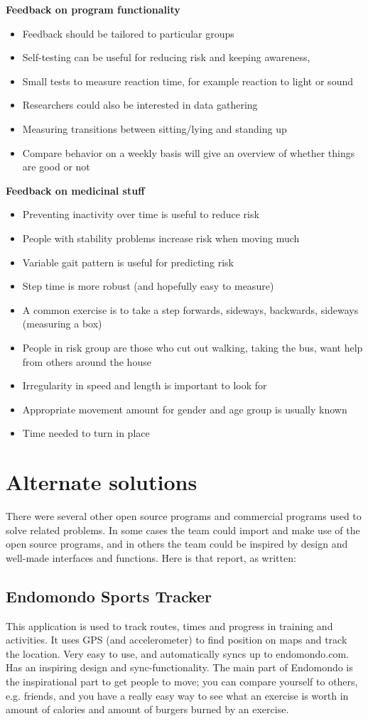 \textbf{Feedback on program functionality}
\begin{itemize}
\item Feedback should be tailored to particular groups
\item Self-testing can be useful for reducing risk and keeping awareness,
\item Small tests to measure reaction time, for example reaction to light or sound
\item Researchers could also be interested in data gathering
\item Measuring transitions between sitting/lying and standing up
\item Compare behavior on a weekly basis will give an overview of whether things are good or not
\end{itemize}

\textbf{Feedback on medicinal stuff}
\begin{itemize}
\item Preventing inactivity over time is useful to reduce risk
\item People with stability problems increase risk when moving much
\item Variable gait pattern is useful for predicting risk
\item Step time is more robust (and hopefully easy to measure)
\item A common exercise is to take a step forwards, sideways, backwards, sideways (measuring a box)
\item People in risk group are those who cut out walking, taking the bus, want help from others around the house
\item Irregularity in speed and length is important to look for
\item Appropriate movement amount for gender and age group is usually known
\item Time needed to turn in place
\end{itemize}


\section{Alternate solutions}
There were several other open source programs and commercial programs used to solve related problems. In some cases the team could import and make use of the open source programs, and in others the team could be inspired by design and well-made interfaces and functions. Here is that report, as written:

\subsection{Endomondo Sports Tracker}
This application is used to track routes, times and progress in training and activities. It uses GPS (and accelerometer) to find position on maps and track the location. Very easy to use, and automatically syncs up to endomondo.com. Has an inspiring design and sync-functionality.
The main part of Endomondo is the inspirational part to get people to move; you can compare yourself to others, e.g. friends, and you have a really easy way to see what an exercise is worth in amount of calories and amount of burgers burned by an exercise.


